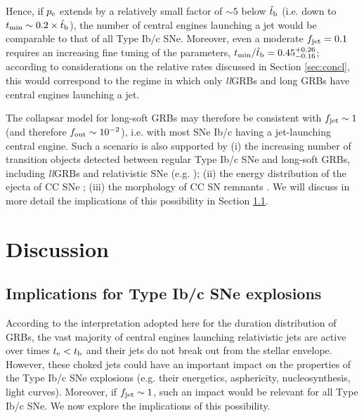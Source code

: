 \documentclass[useAMS,usenatbib]{mn2e}
\begin{document}
Hence, if $p_{\rm e}$ extends by a relatively small factor of $\sim 5$ below $\hat{t}_{\rm b}$ (i.e. down to $t_{\rm min}\sim 0.2\times\hat{t}_{\rm b}$), the number of central engines launching a jet would be comparable to that of all Type Ib/c SNe. Moreover, even a moderate $f_{\rm jet}=0.1$ requires an increasing fine tuning of the parameters, $t_{\rm min}/\hat{t}_{\rm b}=0.45_{-0.16}^{+0.26}$; according to considerations on the relative rates discussed in Section \ref{sec:concl}, this would correspond to the regime in which only {\it ll}GRBs and long GRBs have central engines launching a jet.

The collapsar model for long-soft GRBs may therefore be consistent with $f_{\rm jet}\sim 1$ (and therefore $f_{\rm out}\sim10^{-2}$), i.e. with most SNe Ib/c having a jet-launching central engine. Such a scenario is also supported by (i) the increasing number of transition objects detected between regular Type Ib/c SNe and long-soft GRBs, including {\it ll}GRBs and relativistic SNe (e.g. \citealt{Margutti2014}); (ii) the energy distribution of the ejecta of CC SNe \citep{Piran2017}; (iii) the morphology of CC SN remnants \citep{Bear2017}. We will discuss in more detail the implications of this possibility in Section \ref{sec:implications}.


\section{Discussion}
\label{sec:discussion}

\subsection{Implications for Type Ib/c SNe explosions}
\label{sec:implications}

According to the interpretation adopted here for the duration distribution of GRBs, the vast majority of central engines launching relativistic jets are active over times $t_{\rm e}<t_{\rm b}$ and their jets do not break out from the stellar envelope. However, these choked jets could have an important impact on the properties of the Type Ib/c SNe explosions (e.g. their energetics, asphericity, nucleosynthesis, light curves). Moreover, if $f_{\rm jet}\sim 1$, such an impact would be relevant for all Type Ib/c SNe. We now explore the implications of this possibility.
\end{document}
